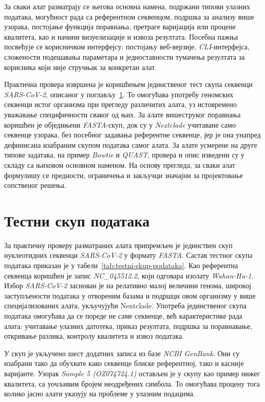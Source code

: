 \documentclass[12pt,oneside]{memoir}
\begin{document}
За сваки алат разматрају се његова основна намена, подржани типови улазних података, могућност рада са референтном секвенцом, подршка за анализу више узорака, постојање функција поравнања, претраге варијација или процене квалитета, као и начини визуелизације и извоза резултата. Посебна пажња посвећује се корисничком интерфејсу: постојању веб-верзије, \textit{CLI}-интерфејса, сложености подешавања параметара и једноставности тумачења резултата за корисника који није стручњак за конкретан алат.

Практична провера извршена је коришћењем јединственог тест скупа секвенци \textit{SARS-CoV-2}, описаног у поглављу~\ref{sec:testni-skup-podataka}. То омогућава употребу геномских секвенци истог организма при прегледу различитих алата, уз истовремено уважавање специфичности сваког од њих. За алате вишеструког поравнања коришћен је обједињени \textit{FASTA}-скуп, док су у \textit{Nextclade} учитаване само секвенце узорака, без посебног задавања референтне секвенце, јер је она унапред дефинисана изабраним скупом података самог алата. За алате усмерене на друге типове задатака, на пример \textit{Bowtie} и \textit{QUAST}, провера и опис изведени су у складу са њиховом основном наменом. На основу прегледа, за сваки алат формулишу се предности, ограничења и закључци значајни за пројектовање сопственог решења.

\section{Тестни скуп података}
\label{sec:testni-skup-podataka}
За практичну проверу разматраних алата припремљен је јединствен скуп нуклеотидних секвенци \textit{SARS-CoV-2} у формату \textit{FASTA}. Састав тестног скупа података приказан је у табели~\ref{tab:testni-skup-podataka}. Као референтна секвенца коришћен је запис \textit{NC\_045512.2}, који одговара изолату \textit{Wuhan-Hu-1}. Избор \textit{SARS-CoV-2} заснован је на релативно малој величини генома, широкој заступљености података у отвореним базама и подршци овом организму у више специјализованих алата, укључујући Nextclade. Употреба јединственог скупа података омогућава да се пореде не саме секвенце, већ карактеристике рада алата: учитавање улазних датотека, приказ резултата, подршка за поравнавање, откривање разлика, контролу квалитета и извоз података.

У скуп је укључено шест додатних записа из базе \textit{NCBI GenBank}. Они су изабрани тако да обухвате како секвенце блиске референтној, тако и касније варијанте. Узорак \textit{Sample 5 (OZ074724.1)} остављен је у скупу као пример нижег квалитета, са уочљивим бројем неодређених симбола. То омогућава процену тога колико јасно алати указују на проблеме у улазним подацима.
\end{document}

